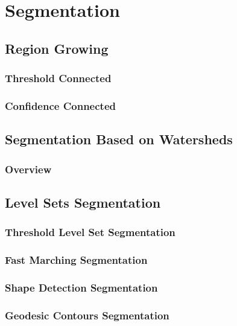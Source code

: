 
\chapter{Segmentation}


\section{Region Growing}
\subsection{Threshold Connected}
\subsection{Confidence Connected}


\section{Segmentation Based on Watersheds}
\label{sec:WatershedSegmentation}


\subsection{Overview}
\label{sec:aboutWatersheds}




\section{Level Sets Segmentation}
\label{sec:LevelSetsSegmentation}

\subsection{Threshold Level Set Segmentation}
\subsection{Fast Marching Segmentation}
\subsection{Shape Detection Segmentation}
\subsection{Geodesic Contours Segmentation}



